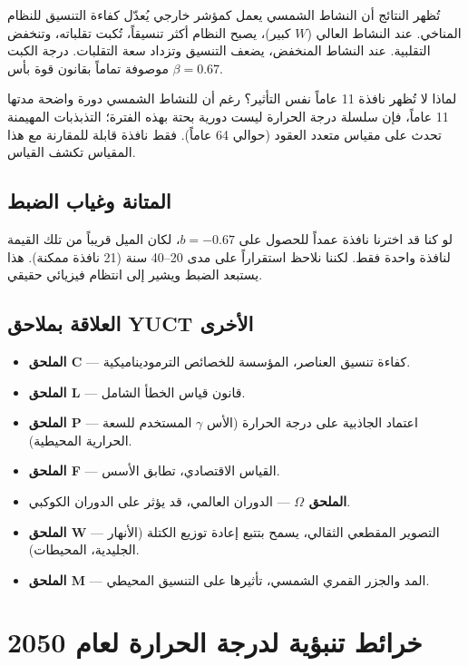 \documentclass[11pt,a4paper]{article}
\newcommand{\be}{\beta}
\newcommand{\ga}{\gamma}
\begin{document}
	تُظهر النتائج أن النشاط الشمسي يعمل كمؤشر خارجي يُعدّل كفاءة التنسيق للنظام المناخي. عند النشاط العالي (\(W\) كبير)، يصبح النظام أكثر تنسيقاً، تُكبت تقلباته، وتنخفض التقلبية. عند النشاط المنخفض، يضعف التنسيق وتزداد سعة التقلبات. درجة الكبت موصوفة تماماً بقانون قوة بأس \(\be = 0.67\).
	
	لماذا لا تُظهر نافذة 11 عاماً نفس التأثير؟ رغم أن للنشاط الشمسي دورة واضحة مدتها 11 عاماً، فإن سلسلة درجة الحرارة ليست دورية بحتة بهذه الفترة؛ التذبذبات المهيمنة تحدث على مقياس متعدد العقود (حوالي 64 عاماً). فقط نافذة قابلة للمقارنة مع هذا المقياس تكشف القياس.
	
	\subsection{المتانة وغياب الضبط}
	
	لو كنا قد اخترنا نافذة عمداً للحصول على \(b = -0.67\)، لكان الميل قريباً من تلك القيمة لنافذة واحدة فقط. لكننا نلاحظ استقراراً على مدى 20–40 سنة (21 نافذة ممكنة). هذا يستبعد الضبط ويشير إلى انتظام فيزيائي حقيقي.
	
	\subsection{العلاقة بملاحق YUCT الأخرى}
	
	\begin{itemize}
		\item \textbf{الملحق C} — كفاءة تنسيق العناصر، المؤسسة للخصائص الترموديناميكية.
		\item \textbf{الملحق L} — قانون قياس الخطأ الشامل.
		\item \textbf{الملحق P} — اعتماد الجاذبية على درجة الحرارة (الأس \(\ga\) المستخدم للسعة الحرارية المحيطية).
		\item \textbf{الملحق F} — القياس الاقتصادي، تطابق الأسس.
		\item \textbf{الملحق \(\Omega\)} — الدوران العالمي، قد يؤثر على الدوران الكوكبي.
		\item \textbf{الملحق W} — التصوير المقطعي الثقالي، يسمح بتتبع إعادة توزيع الكتلة (الأنهار الجليدية، المحيطات).
		\item \textbf{الملحق M} — المد والجزر القمري الشمسي، تأثيرها على التنسيق المحيطي.
	\end{itemize}
	
	\section{خرائط تنبؤية لدرجة الحرارة لعام 2050}
	\label{sec:forecast_maps}
	
\end{document}
